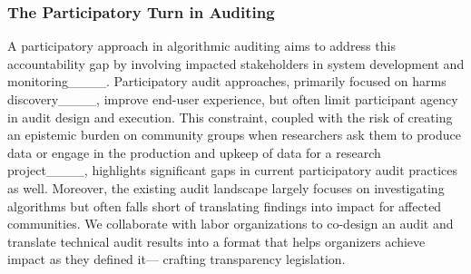 \subsubsection{The Participatory Turn in Auditing}
A participatory approach in algorithmic auditing aims to address this accountability gap by involving impacted stakeholders in system development and monitoring____. Participatory audit approaches, primarily focused on harms discovery____, improve end-user experience, but often limit participant agency in audit design and execution. This constraint, coupled with the risk of creating an epistemic burden on community groups when researchers ask them to produce data or engage in the production and upkeep of data for a research project____, highlights significant gaps in current participatory audit practices as well. Moreover, the existing audit landscape largely focuses on investigating algorithms but often falls short of translating findings into impact for affected communities. We collaborate with labor organizations to co-design an audit and translate technical audit results into a format that helps organizers achieve impact as they defined it--- crafting transparency legislation.